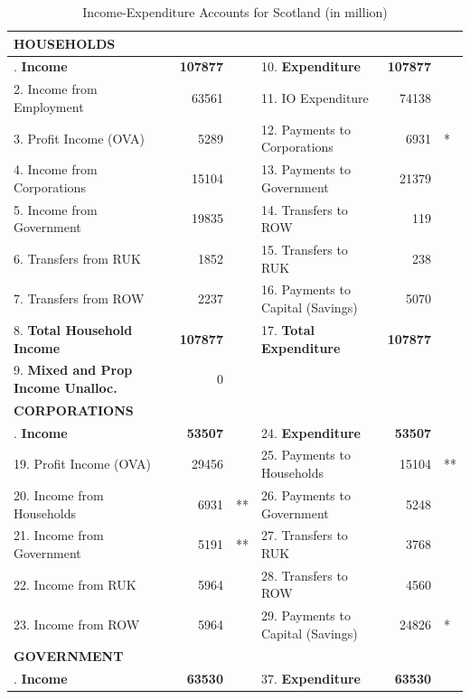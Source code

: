 \begin{table}[H] \caption{Income-Expenditure Accounts for Scotland (in \textsterling million)}
\bigskip \begin{scriptsize} \begin{centering} \begin{spacing}{1.2}
    \begin{tabular}{lrllrl}
          \toprule
    \textbf{HOUSEHOLDS} \bigstrut\\
    \hline  
\bigstrut[t]    1. \textbf{Income} & \textbf{107877} & & 10. \textbf{Expenditure} & \textbf{107877} & \\
    2. Income from Employment & 63561  &   & 11. IO Expenditure & 74138 & \\
    3. Profit Income (OVA) & 5289 & & 12. Payments to Corporations & 6931 &* \\
    4. Income from Corporations & 15104 & & 13. Payments to Government & 21379 & \\
    5. Income from Government & 19835 & & 14. Transfers to ROW & 119 & \\
    6. Transfers from RUK & 1852 & & 15. Transfers to RUK & 238 & \\
    7. Transfers from ROW & 2237 & & 16. Payments to Capital (Savings) & 5070 &\\
    8. \textbf{Total Household Income} & \textbf{107877} & & 17. \textbf{Total Expenditure} & \textbf{107877} & \\
    9. \textbf{Mixed and Prop Income Unalloc.} & 0 & \bigstrut[b]\\
    \hline
\bigstrut[t]    \textbf{CORPORATIONS} \bigstrut\\
    \hline
\bigstrut[t] 18. \textbf{Income} & \textbf{53507}  &   & 24. \textbf{Expenditure} & \textbf{53507} & \\
       19. Profit Income (OVA) & 29456 & & 25. Payments to Households & 15104 &** \\
       20. Income from Households & 6931 &** & 26. Payments to Government & 5248 & \\
       21. Income from Government & 5191 &** & 27. Transfers to RUK & 3768 & \\
       22. Income from RUK & 5964 & & 28. Transfers to ROW & 4560 & \\
       23. Income from ROW & 5964 & & 29. Payments to Capital (Savings) & 24826 &* \\
    \hline
    \textbf{GOVERNMENT} \bigstrut\\
	\hline
\bigstrut[t]       30. \textbf{Income} & \textbf{63530}  &   & 37. \textbf{Expenditure} & \textbf{63530} & \\

\end{tabular}
\end{spacing}
\end{centering}
\end{scriptsize}
\end{table}
